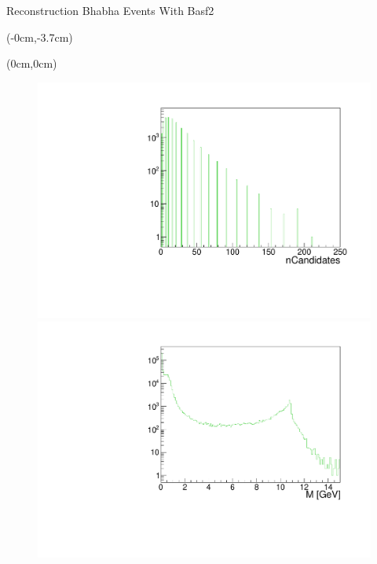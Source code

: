 \documentclass[8pt]{beamer}
\begin{document}
\begin{frame}{Reconstruction Bhabha Events With Basf2}

\lstset{language=Python}
\lstset{basicstyle=\scriptsize}

\begin{textblock*}{\textwidth}(-0cm,-3.7cm)




\end{textblock*}

\begin{textblock*}{11cm}(0cm,0cm)
			
\begin{figure}[h!]
	\centering
	\begin{minipage}[b]{0.45\linewidth}
		\centering
		\includegraphics[width=\textwidth]{VBilder/nCandAll.pdf}
	\end{minipage}
	\hspace{0.5cm}
	\begin{minipage}[b]{0.45\linewidth}
		\centering
		\includegraphics[width=\textwidth]{VBilder/Mall.pdf}
	\end{minipage}
	

\end{figure}
\end{textblock*}
\end{frame}
\end{document}
